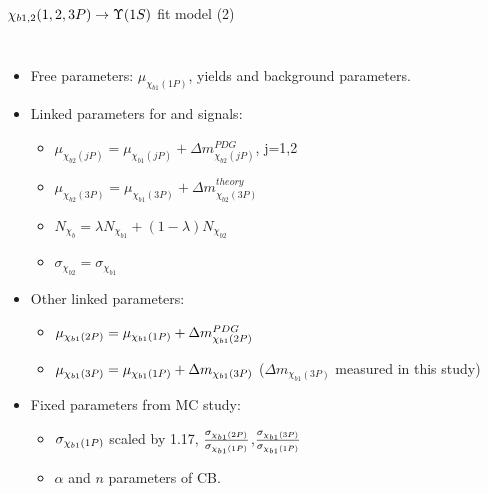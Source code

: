 \begin{frame}{$\chi_{b1,2}(1,2,3P) \to \OneS$ fit model (2)}
\begin{columns}[T]
\begin{itemize}
\item Free parameters: $\mu_{\chi_{b1}(1P)}$, yields and background parameters.
\item Linked parameters for \chibone and \chibtwo signals:
    \begin{itemize}
    \item $\mu_{\chi_{b2}(jP)} = \mu_{\chi_{b1}(jP)} + \Delta m_{\chi_{b2}(jP)}^{PDG}$, j=1,2
    \item $\mu_{\chi_{b2}(3P)} = \mu_{\chi_{b1}(3P)} + \Delta m_{\chi_{b2}(3P)}^{theory}$
    \item $N_{\chi_{b}} = \lambda N_{\chi_{b1}} + (1-\lambda) N_{\chi_{b2}}$
    \item $\sigma_{\chi_{b2}} = \sigma_{\chi_{b1}}$
    \end{itemize}
\item Other linked parameters:    
    \begin{itemize}
        \item $\mu_{\chi_{b 1}(2P)} = \mu_{\chi_{b 1}(1P)} + \Delta m_{\chi_{b1}(2P)}^{PDG}$
        \item $\mu_{\chi_{b 1}(3P)} = \mu_{\chi_{b 1}(1P)} + \Delta m_{\chi_{b1}(3P)}$ ($\Delta m_{\chi_{b1}(3P)}$ measured in this study)
    \end{itemize}
\item Fixed parameters from MC study:
    \begin{itemize}
    \item $\sigma_{\chi_{b 1}(1P)}$ \scriptsize{scaled by 1.17}, $\frac{\sigma_{\chi_{b 1}(2P)}}{\sigma_{\chi_{b 1}(1P)}}$,$\frac{\sigma_{\chi_{b 1}(3P)}}{\sigma_{\chi_{b 1}(1P)}}$
    \item $\alpha$ and $n$ parameters of CB.
    \end{itemize}
\end{itemize}
\end{columns}
\end{frame}
